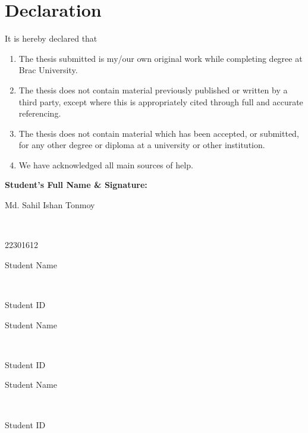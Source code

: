\newcommand*\wildcard[2][6cm]{\vspace{2cm}\parbox{#1}{\hrulefill\par#2}} 


\section*{Declaration}

It is hereby declared that

\begin{enumerate} %
  \item The thesis submitted is my/our own original work while completing degree at Brac University.
  \item The thesis does not contain material previously published or written by a third party, except where this is appropriately cited through full and accurate referencing.
  \item The thesis does not contain material which has been accepted, or submitted, for any other degree or diploma at a university or other institution.
  \item We have acknowledged all main sources of help.
\end{enumerate}

\vspace{1cm}
\textbf{Student’s Full Name \& Signature:} %

\begingroup

    \begin{center}
        \wildcard{\centerline{Md. Sahil Ishan Tonmoy} ~\\ \centerline{22301612}} %
        \hspace{2cm} %
        \wildcard{\centerline{Student Name} ~\\ \centerline{Student ID} }
        \wildcard{\centerline{Student Name} ~\\ \centerline{Student ID} }
        \hspace{2cm}
        \wildcard{\centerline{Student Name} ~\\ \centerline{Student ID} }
    \end{center}

\endgroup


\pagebreak






